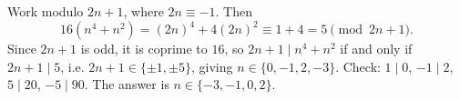 Work modulo $2n+1$, where $2n\equiv-1$. Then
\[16(n^4+n^2)=(2n)^4+4(2n)^2\equiv1+4=5\pmod{2n+1}.\]
Since $2n+1$ is odd, it is coprime to $16$, so $2n+1\mid n^4+n^2$ if and only if $2n+1\mid5$, i.e. $2n+1\in\{\pm1,\pm5\}$, giving $n\in\{0,-1,2,-3\}$. Check: $1\mid0$, $-1\mid2$, $5\mid20$, $-5\mid90$. The answer is $\boxed{n\in\{-3,-1,0,2\}}$.
